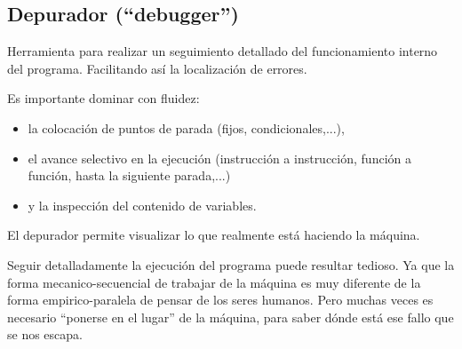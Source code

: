 \documentclass[spanish,12pt,a4paper,final,oneside]{book}
\begin{document}
\vspace{1cm}


\subsection{Depurador (``debugger'')}
Herramienta para realizar un seguimiento detallado del funcionamiento interno del programa. Facilitando así la localización de errores.

Es importante dominar con fluidez:
\begin{itemize}
\item la colocación de puntos de parada (fijos, condicionales,...), 
\item el avance selectivo en la ejecución (instrucción a instrucción, función a función, hasta la siguiente parada,...) 
\item y la inspección del contenido de variables.
\end{itemize}

El depurador permite visualizar lo que realmente está haciendo la máquina. 

Seguir detalladamente la ejecución del programa puede resultar tedioso. Ya que la forma mecanico-secuencial de trabajar de la máquina es muy diferente de la forma empirico-paralela de pensar de los seres humanos. Pero muchas veces es necesario ``ponerse en el lugar'' de la máquina, para saber dónde está ese fallo que se nos escapa.
\end{document}
